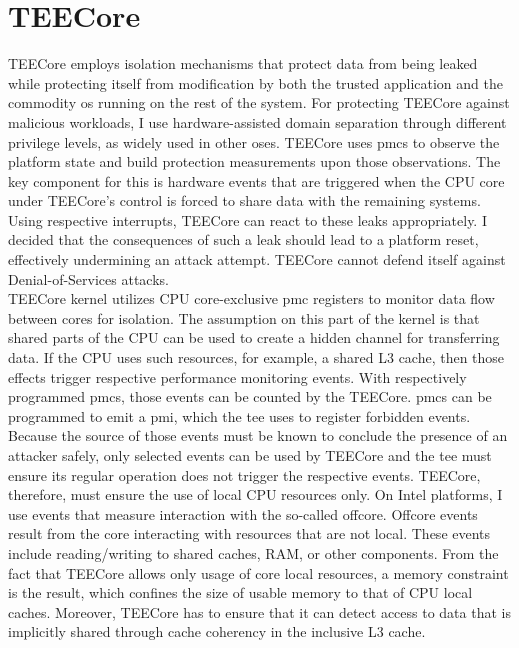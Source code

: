 \section{TEECore}
\label{sec:30:tee_kernel}
TEECore employs isolation mechanisms that protect data from being leaked while
protecting itself from modification by both the trusted application and the
commodity \gls{os} running on the rest of the system. For protecting TEECore
against malicious workloads, I use hardware-assisted domain separation through
different privilege levels, as widely used in other \gls{os}es. TEECore uses
\glspl{pmc} to observe the platform state and build protection measurements upon
those observations. The key component for this is hardware events that are
triggered when the CPU core under TEECore's control is forced to share data with
the remaining systems. Using respective interrupts, TEECore can react to these
leaks appropriately. I decided that the consequences of such a leak should lead
to a platform reset, effectively undermining an attack attempt. TEECore cannot
defend itself against Denial-of-Services attacks.\\

TEECore kernel utilizes CPU core-exclusive \gls{pmc} registers to monitor data
flow between cores for isolation. The assumption on this part of the kernel is
that shared parts of the CPU can be used to create a hidden channel for
transferring data. If the CPU uses such resources, for example, a shared L3
cache, then those effects trigger respective performance monitoring events. With
respectively programmed \glspl{pmc}, those events can be counted by the TEECore.
\glspl{pmc} can be programmed to emit a \gls{pmi}, which the \gls{tee} uses to
register forbidden events. Because the source of those events must be known to
conclude the presence of an attacker safely, only selected events can be used by
TEECore and the \gls{tee} must ensure its regular operation does not trigger the
respective events. TEECore, therefore, must ensure the use of local CPU
resources only. On Intel platforms, I use events that measure interaction with
the so-called offcore. Offcore events result from the core interacting with
resources that are not local. These events include reading/writing to shared
caches, RAM, or other components. From the fact that TEECore allows only usage
of core local resources, a memory constraint is the result, which confines the
size of usable memory to that of CPU local caches. Moreover, TEECore has to
ensure that it can detect access to data that is implicitly shared through cache
coherency in the inclusive L3 cache.\\

